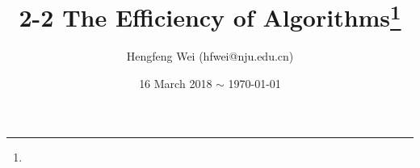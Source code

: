 \documentclass{tufte-handout}
\title{2-2 The Efficiency of Algorithms\thanks{}}
\author[hengxin]{Hengfeng Wei {\normalsize (hfwei@nju.edu.cn)}}
\date{16 March 2018 $\sim$ \today{}}
\begin{document}
\begin{CJK*}{UTF8}{gbsn}

\maketitle










\end{CJK*}
\end{document}
